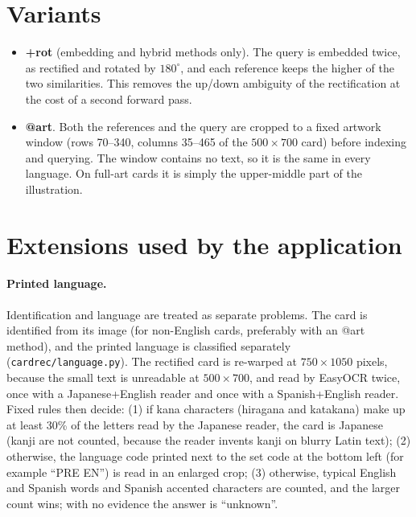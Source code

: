 \section{Variants}
\label{sec:variants}

\begin{itemize}
  \item \textbf{+rot} (embedding and hybrid methods only). The query is embedded twice, as rectified and rotated by $180^\circ$, and each reference keeps the higher of the two similarities. This removes the up/down ambiguity of the rectification at the cost of a second forward pass.
  \item \textbf{@art}. Both the references and the query are cropped to a fixed artwork window (rows 70--340, columns 35--465 of the $500\times700$ card) before indexing and querying. The window contains no text, so it is the same in every language. On full-art cards it is simply the upper-middle part of the illustration.
\end{itemize}

\section{Extensions used by the application}
\label{sec:extensions}

\paragraph{Printed language.} Identification and language are treated as separate problems. The card is identified from its image (for non-English cards, preferably with an @art method), and the printed language is classified separately (\texttt{cardrec/language.py}). The rectified card is re-warped at $750\times1050$ pixels, because the small text is unreadable at $500\times700$, and read by EasyOCR twice, once with a Japanese+English reader and once with a Spanish+English reader. Fixed rules then decide: (1) if kana characters (hiragana and katakana) make up at least 30\% of the letters read by the Japanese reader, the card is Japanese (kanji are not counted, because the reader invents kanji on blurry Latin text); (2) otherwise, the language code printed next to the set code at the bottom left (for example ``PRE EN'') is read in an enlarged crop; (3) otherwise, typical English and Spanish words and Spanish accented characters are counted, and the larger count wins; with no evidence the answer is ``unknown''.


